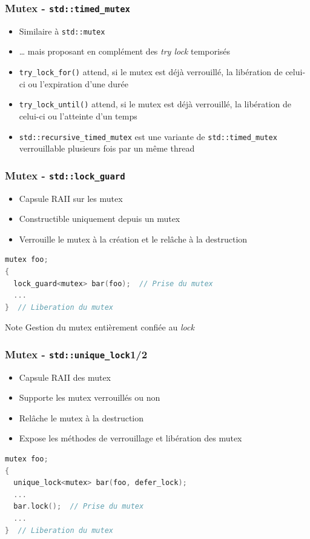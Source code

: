 \documentclass[C++.tex]{subfiles}
\begin{document}
\begin{frame}[fragile]
	\frametitle{Mutex - \lstinline|std::timed_mutex|}
	\begin{itemize}
		\item Similaire à \lstinline|std::mutex|
		\item \ldots{} mais proposant en complément des \textit{try lock} temporisés
		\item \lstinline|try_lock_for()| attend, si le mutex est déjà verrouillé, la libération de celui-ci ou l'expiration d'une durée
		\item \lstinline|try_lock_until()| attend, si le mutex est déjà verrouillé, la libération de celui-ci ou l'atteinte d'un temps
		\item \lstinline|std::recursive_timed_mutex| est une variante de \lstinline|std::timed_mutex| verrouillable plusieurs fois par un même thread
	\end{itemize}
\end{frame}

\begin{frame}[fragile]
	\frametitle{Mutex - \lstinline|std::lock_guard|}
	\begin{itemize}
		\item Capsule RAII sur les mutex
		\item Constructible uniquement depuis un mutex
		\item Verrouille le mutex à la création et le relâche à la destruction
	\end{itemize}

	\begin{lstlisting}[language=C++]
mutex foo;
{
  lock_guard<mutex> bar(foo);  // Prise du mutex
  ...
}  // Liberation du mutex\end{lstlisting}

	\begin{block}{Note}
		Gestion du mutex entièrement confiée au \textit{lock}
	\end{block}
\end{frame}

\begin{frame}[fragile]
	\frametitle{Mutex - \lstinline|std::unique_lock|\titlehfill{}1/2}
	\begin{itemize}
		\item Capsule RAII des mutex
		\item Supporte les mutex verrouillés ou non
		\item Relâche le mutex à la destruction
		\item Expose les méthodes de verrouillage et libération des mutex
	\end{itemize}

	\begin{lstlisting}[language=C++]
mutex foo;
{
  unique_lock<mutex> bar(foo, defer_lock);
  ...
  bar.lock();  // Prise du mutex
  ...
}  // Liberation du mutex\end{lstlisting}
\end{frame}
\end{document}
